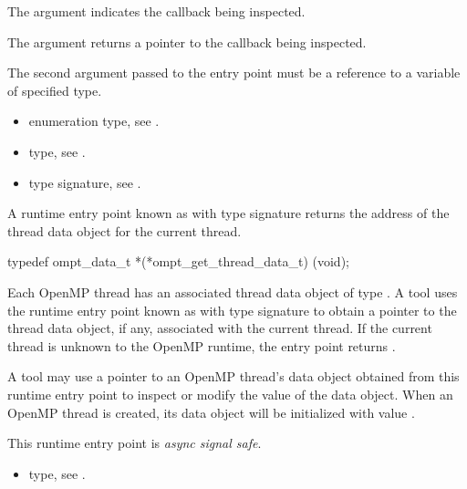 \argdesc

The argument  indicates the callback being inspected.

The argument  returns a pointer to the callback being inspected.

\constraints
The second argument passed to the entry point must be a reference
to a variable of specified type.

\crossreferences
\begin{itemize}
\item {} enumeration type, see .
\item {} type, see .
\item {} type signature,
see .
\end{itemize}


\label{sec:ompt_get_thread_data_t}
\label{sec:ompt_get_thread_data}

\summary
A runtime entry point known as 
with type signature 
returns the address of the thread data object for the current thread.

\format
\begin{ccppspecific}
\begin{omptInquiry}
typedef ompt_data_t *(*ompt_get_thread_data_t) (void);
\end{omptInquiry}
\end{ccppspecific}

\descr

Each OpenMP thread has an associated thread data object of type
.
A tool uses the runtime entry point known as
with type signature 
to obtain a pointer to the thread data object, if any, associated with the
current thread. If the current thread is unknown to the OpenMP
runtime, the entry point returns .

A tool may use a pointer to an OpenMP thread's data object
obtained from this runtime entry point to
inspect or modify the value of the data object.
When an OpenMP thread is created, its data object will be initialized
with value .

This runtime entry point is \emph{async signal safe}.

\crossreferences
\begin{itemize}
\item {} type, see .
\end{itemize}


